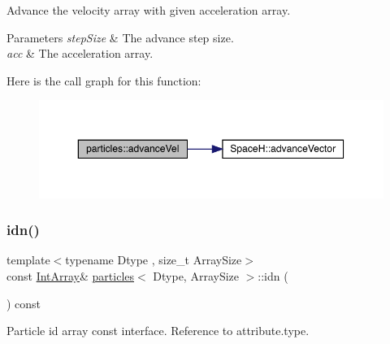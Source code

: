 Advance the velocity array with given acceleration array. 


\begin{DoxyParams}{Parameters}
{\em step\+Size} & The advance step size. \\
\hline
{\em acc} & The acceleration array. \\
\hline
\end{DoxyParams}
Here is the call graph for this function\+:\nopagebreak
\begin{figure}[H]
\begin{center}
\leavevmode
\includegraphics[width=350pt]{classparticles_a7d515e6e655de14cdfbf6e943992ebfb_cgraph}
\end{center}
\end{figure}
\mbox{\label{classparticles_a5edbd588217cd1a7deb2010bf8f3e1fe}} 
\subsubsection{\texorpdfstring{idn()}{idn()}\hspace{0.1cm}{\footnotesize\ttfamily [1/2]}}
{\footnotesize\ttfamily template$<$typename Dtype , size\+\_\+t Array\+Size$>$ \\
const \mbox{\hyperlink{classparticles_a1b766bf5ccced2005beaacbb07e46bf9}{Int\+Array}}\& \mbox{\hyperlink{classparticles}{particles}}$<$ Dtype, Array\+Size $>$\+::idn (\begin{DoxyParamCaption}{ }\end{DoxyParamCaption}) const\hspace{0.3cm}{\ttfamily [inline]}}



Particle id array const interface. Reference to attribute.\+type. 

\mbox{\label{classparticles_aff81c64079780f86f8d61648d68de12e}} 
